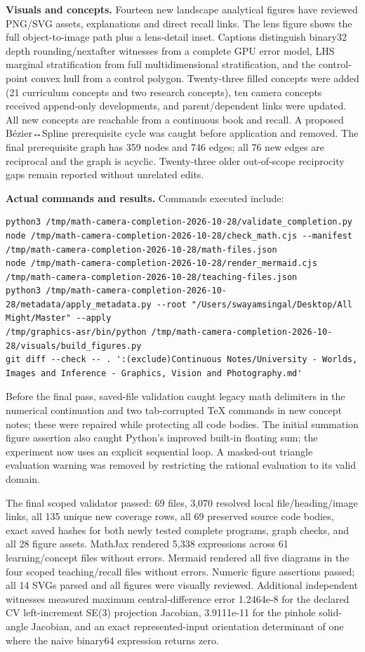 \textbf{Visuals and concepts.} Fourteen new landscape analytical figures have reviewed PNG/SVG assets, explanations and direct recall links. The lens figure shows the full object-to-image path plus a lens-detail inset. Captions distinguish binary32 depth rounding/nextafter witnesses from a complete GPU error model, LHS marginal stratification from full multidimensional stratification, and the control-point convex hull from a control polygon. Twenty-three filled concepts were added (21 curriculum concepts and two research concepts), ten camera concepts received append-only developments, and parent/dependent links were updated. All new concepts are reachable from a continuous book and recall. A proposed Bézier↔Spline prerequisite cycle was caught before application and removed. The final prerequisite graph has 359 nodes and 746 edges; all 76 new edges are reciprocal and the graph is acyclic. Twenty-three older out-of-scope reciprocity gaps remain reported without unrelated edits.

\textbf{Actual commands and results.} Commands executed include:

\begin{verbatim}
python3 /tmp/math-camera-completion-2026-10-28/validate_completion.py
node /tmp/math-camera-completion-2026-10-28/check_math.cjs --manifest /tmp/math-camera-completion-2026-10-28/math-files.json
node /tmp/math-camera-completion-2026-10-28/render_mermaid.cjs /tmp/math-camera-completion-2026-10-28/teaching-files.json
python3 /tmp/math-camera-completion-2026-10-28/metadata/apply_metadata.py --root "/Users/swayamsingal/Desktop/All Might/Master" --apply
/tmp/graphics-asr/bin/python /tmp/math-camera-completion-2026-10-28/visuals/build_figures.py
git diff --check -- . ':(exclude)Continuous Notes/University - Worlds, Images and Inference - Graphics, Vision and Photography.md'
\end{verbatim}

Before the final pass, saved-file validation caught legacy math delimiters in the numerical continuation and two tab-corrupted TeX commands in new concept notes; these were repaired while protecting all code bodies. The initial summation figure assertion also caught Python's improved built-in floating sum; the experiment now uses an explicit sequential loop. A masked-out triangle evaluation warning was removed by restricting the rational evaluation to its valid domain.

The final scoped validator passed: 69 files, 3,070 resolved local file/heading/image links, all 135 unique new coverage rows, all 69 preserved source code bodies, exact saved hashes for both newly tested complete programs, graph checks, and all 28 figure assets. MathJax rendered 5,338 expressions across 61 learning/concept files without errors. Mermaid rendered all five diagrams in the four scoped teaching/recall files without errors. Numeric figure assertions passed; all 14 SVGs parsed and all figures were visually reviewed. Additional independent witnesses measured maximum central-difference error 1.2464e-8 for the declared CV left-increment SE(3) projection Jacobian, 3.9111e-11 for the pinhole solid-angle Jacobian, and an exact represented-input orientation determinant of one where the naive binary64 expression returns zero.

